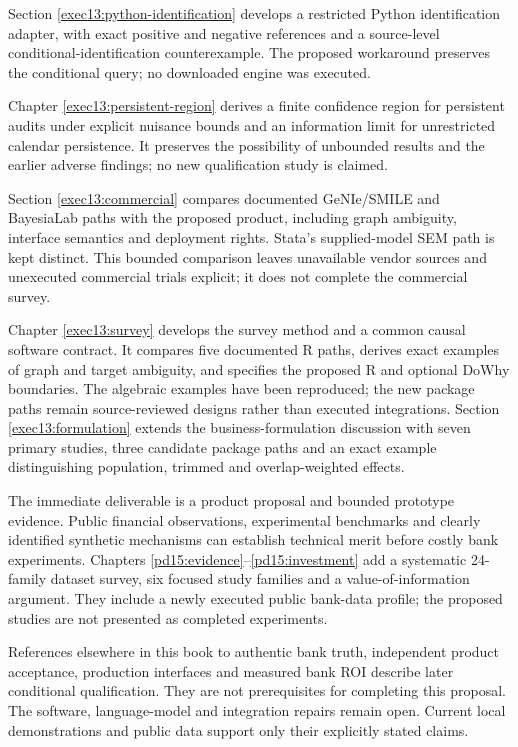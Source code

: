 \documentclass[11pt,a4paper,openany]{book}
\begin{document}
Section \ref{exec13:python-identification} develops a restricted Python
identification adapter, with exact positive and negative references and a
source-level conditional-identification counterexample. The proposed workaround
preserves the conditional query; no downloaded engine was executed.


Chapter \ref{exec13:persistent-region} derives a finite confidence region for
persistent audits under explicit nuisance bounds and an information limit for
unrestricted calendar persistence. It preserves the possibility of unbounded
results and the earlier adverse findings; no new qualification study is claimed.


Section \ref{exec13:commercial} compares documented GeNIe/SMILE and BayesiaLab
paths with the proposed product, including graph ambiguity, interface semantics
and deployment rights. Stata's supplied-model SEM path is kept distinct.
This bounded comparison leaves unavailable vendor sources and unexecuted
commercial trials explicit; it does not complete the commercial survey.


Chapter \ref{exec13:survey} develops the survey method and a common causal
software contract. It compares five documented R paths, derives exact examples
of graph and target ambiguity, and specifies the proposed R and optional DoWhy
boundaries. The algebraic examples have been reproduced; the new package
paths remain source-reviewed designs rather than executed integrations.
Section \ref{exec13:formulation} extends the business-formulation discussion
with seven primary studies, three candidate package paths and an exact
example distinguishing population, trimmed and overlap-weighted effects.


The immediate deliverable is a product proposal and bounded prototype evidence.
Public financial observations, experimental benchmarks and clearly identified
synthetic mechanisms can establish technical merit before costly bank experiments.
Chapters \ref{pd15:evidence}--\ref{pd15:investment} add a systematic 24-family
dataset survey, six focused study families and a value-of-information argument.
They include a newly executed public bank-data profile; the proposed studies
are not presented as completed experiments.

References elsewhere in this book to authentic bank truth, independent product
acceptance, production interfaces and measured bank ROI describe later conditional
qualification. They are not prerequisites for completing this proposal.
The software, language-model and integration repairs remain open. Current local
demonstrations and public data support only their explicitly stated claims.
\end{document}
